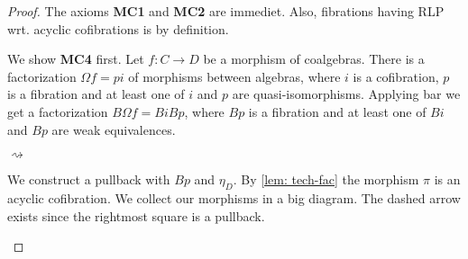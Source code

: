 \documentclass[../thesis.tex]{subfiles}
\begin{document}
            \begin{proof}
                The axioms \textbf{MC1} and \textbf{MC2} are immediet. Also, fibrations having RLP wrt. acyclic cofibrations is by definition.

                We show \textbf{MC4} first. Let $f : C\rightarrow D$ be a morphism of coalgebras. There is a factorization $\Omega f = pi$ of morphisms between algebras, where $i$ is a cofibration, $p$ is a fibration and at least one of $i$ and $p$ are quasi-isomorphisms. Applying bar we get a factorization $B\Omega f = BiBp$, where $Bp$ is a fibration and at least one of $Bi$ and $Bp$ are weak equivalences.
                \begin{center}
                     $\rightsquigarrow$
                \end{center}

                We construct a pullback with $Bp$ and $\eta_D$. By \ref{lem: tech-fac} the morphism $\pi$ is an acyclic cofibration. We collect our morphisms in a big diagram. The dashed arrow exists since the rightmost square is a pullback.
                \begin{center}
                \end{center}
                

\end{proof}
\end{document}
